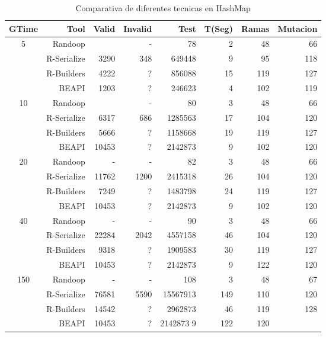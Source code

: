 \begin{table}[H]
\scriptsize
\centering
\label{tab:results-obj1}
\begin{tabular}{ c  r  |r | r | r|r|r|r  }
  \toprule
  \textbf{GTime} & \textbf{Tool} & \textbf{Valid}  & \textbf{Invalid} & \textbf{Test}&\textbf{T(Seg)} &\textbf{Ramas}  & \textbf{Mutacion} \\ 
  \midrule
5	&	Randoop	&		&	-	&	78	&	2	&	48	&	66	\\
	&	R-Serialize	&	3290	&	348	&	649448	&	9	&	95	&	118	\\
	&	R-Builders	&	4222	&	?	&	856088	&	15	&	119	&	127	\\
	&	BEAPI	&	1203	&	?	&	246623	&	4	&	102	&	119	 \\
 \cline{2-8}															
10	&	Randoop	&		&	-	&	80	&	3	&	48	&	66	\\
	&	R-Serialize	&	6317	&	686	&	1285563	&	17	&	104	&	120	\\
	&	R-Builders	&	5666	&	?	&	1158668	&	19	&	119	&	127	\\
	&	BEAPI	&	10453	&	?	&	2142873	&	9	&	102	&	120	\\
 \cline{2-8}															
20	&	Randoop	&	-	&	-	&	82	&	3	&	48	&	66	\\
	&	R-Serialize	&	11762	&	1200	&	2415318	&	26	&	104	&	120	\\
	&	R-Builders	&	7249	&	?	&	1483798	&	24	&	119	&	127	\\
	&	BEAPI	&	10453	&	?	&	2142873	&	9	&	102	&	120	 \\
 \cline{2-8}															
40	&	Randoop	&	-	&	-	&	90	&	3	&	48	&	66	\\
	&	R-Serialize	&	22284	&	2042	&	4557158	&	46	&	104	&	120	\\
	&	R-Builders	&	9318	&	?	&	1909583	&	30	&	119	&	127	\\
	&	BEAPI	&	10453	&	?	&	2142873	&	9	&	122	&	120	\\ 
 \cline{2-8}															
150	&	Randoop	&	-	&	-	&	108	&	3	&	48	&	67	\\
	&	R-Serialize	&	76581	&	5590	&	15567913	&	149	&	110	&	120	\\
	&	R-Builders	&	14542	&	?	&	2962873	&	46	&	119	&	128	\\
	&	BEAPI	&	10453	&	?	&	2142873		9	&	122	&	120		\\
\midrule
\end{tabular}
\label{tab:hashMapTools}
\caption{Comparativa de diferentes tecnicas en HashMap}
\end{table}